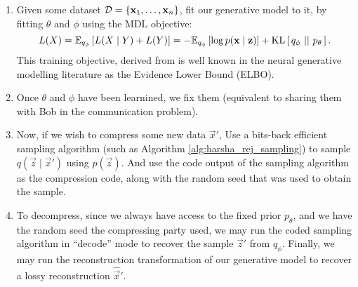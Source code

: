 \begin{enumerate}
\item Given some dataset $\mathcal{D} = \{\mathbf{x}_1, \hdots, \mathbf{x}_n\}$, fit our
  generative model to it, by fitting $\theta$ and $\phi$ using the MDL
  objective:
  \begin{equation}
    \label{eq:mdl_elbo}
    L(X) = \Exp{L(X \mid Y) + L(Y)}{q_\phi}
         =  -\Exp{\log p(\vec{x} \mid \vec{z})}{q_\phi} + \KL{q_\phi}{p_\theta}.
  \end{equation}
  This training objective, derived from \cite{hinton1993keeping} is well known
  in the neural generative modelling literature as the Evidence Lower Bound (ELBO).

  \item Once $\theta$ and $\phi$ have been learnined, we fix them (equivalent to
    sharing them with Bob in the communication problem).

  \item Now, if we wish to compress some new data $\vec{x}'$, Use a bits-back
    efficient sampling algorithm (such as Algorithm
    \ref{alg:harsha_rej_sampling}) to sample $q(\vec{z} \mid \vec{x}')$ using
    $p(\vec{z})$. And use the code output of the sampling algorithm as the
    compression code, along with the random seed that was used to obtain the sample. 

  \item To decompress, since we always have access to the fixed prior
    $p_\theta$, and we have the random seed the compressing party used, we may
    run the coded sampling algorithm in ``decode'' mode to recover the sample $\vec{z}'$
    from $q_\phi$. Finally, we may run the reconstruction transformation of our
    generative model to recover a lossy reconstruction $\hat{\vec{x}}'$.
\end{enumerate}

